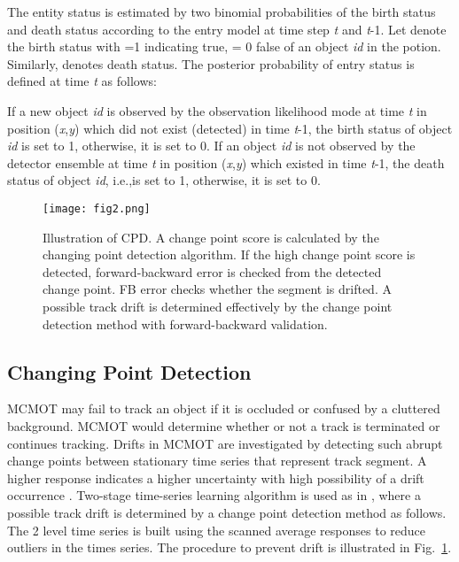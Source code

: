\documentclass[runningheads]{llncs}
\begin{document}
The entity status is estimated by two binomial probabilities of the birth status and death status according to the entry model at time step \textit{t} and \textit{t}-1. Let  denote the birth status with =1 indicating true, = 0 false of an object \textit{id} in the potion. Similarly, denotes death status. The posterior probability of entry status is defined at time \textit{t} as follows:

 

If a new object \textit{id} is observed by the observation likelihood mode at time \textit{t} in position (\textit{x},\textit{y}) which\textit{ }did not exist (detected) in time \textit{t}-1, the birth status of object \textit{id} is set to 1, otherwise, it is set to 0. If an object \textit{id} is not observed by the detector ensemble at time \textit{t} in position (\textit{x},\textit{y}) which\textit{ }existed in time \textit{t}-1, the death status of object \textit{id}, i.e.,is set to 1, otherwise, it is set to 0. 

\begin{figure}[t!]
\centering
\texttt{[image: fig2.png]}
\caption{Illustration of CPD. A change point score is calculated by the changing point detection algorithm. If the high change point score is detected, forward-backward error is checked from the detected change point. FB error checks whether the segment is drifted. A possible track drift is determined effectively by the change point detection method with forward-backward validation.}
\label{fig:2}
\end{figure}

\subsection{Changing Point Detection}

MCMOT may fail to track an object if it is occluded or confused by a cluttered background. MCMOT would determine whether or not a track is terminated or continues tracking. Drifts in MCMOT are investigated by detecting such abrupt change points between stationary time series that represent track segment. A higher response indicates a higher uncertainty with high possibility of a drift occurrence \cite{Ref25}. Two-stage time-series learning algorithm is used as in \cite{Ref24}, where a possible track drift is determined by a change point detection method \cite{Ref24} as follows. The 2 level time series is built using the scanned average responses to reduce outliers in the times series. The procedure to prevent drift is illustrated in Fig.~\ref{fig:2}. 
\end{document}
